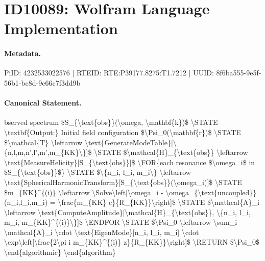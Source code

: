 \section*{ID10089: Wolfram Language Implementation}
\paragraph{Metadata.}
PiID: 4232533022576 | RTEID: RTE:P39177.8275:T1.7212 | UUID: 8f6ba555-9e5f-56b1-bc8d-9c66c7f3dd9b

\paragraph{Canonical Statement.}
bserved spectrum \$S\_\{\textbackslash{}text\{obs\}\}(\textbackslash{}omega, \textbackslash{}mathbf\{k\})\$ \textbackslash{}STATE \textbackslash{}textbf\{Output:\} Initial field configuration \$\textbackslash{}Psi\_0(\textbackslash{}mathbf\{r\})\$ \textbackslash{}STATE \$\textbackslash{}mathcal\{T\} \textbackslash{}leftarrow \textbackslash{}text\{GenerateModeTable\}[\textbackslash{}\{n,l,m,n',l',m',m\_\{KK\}\textbackslash{}\}]\$ \textbackslash{}STATE \$\textbackslash{}mathcal\{H\}\_\{\textbackslash{}text\{obs\}\} \textbackslash{}leftarrow \textbackslash{}text\{MeasureHelicity\}[S\_\{\textbackslash{}text\{obs\}\}]\$ \textbackslash{}FOR\{each resonance \$\textbackslash{}omega\_i\$ in \$S\_\{\textbackslash{}text\{obs\}\}\$\} \textbackslash{}STATE \$\textbackslash{}\{n\_i, l\_i, m\_i\textbackslash{}\} \textbackslash{}leftarrow \textbackslash{}text\{SphericalHarmonicTransform\}[S\_\{\textbackslash{}text\{obs\}\}(\textbackslash{}omega\_i)]\$ \textbackslash{}STATE \$m\_\{KK\}\textasciicircum{}\{(i)\} \textbackslash{}leftarrow \textbackslash{}Solve\textbackslash{}left[\textbackslash{}omega\_i - \textbackslash{}omega\_\{\textbackslash{}text\{uncoupled\}\}(n\_i,l\_i,m\_i) = \textbackslash{}frac\{m\_\{KK\} c\}\{R\_\{KK\}\}\textbackslash{}right]\$ \textbackslash{}STATE \$\textbackslash{}mathcal\{A\}\_i \textbackslash{}leftarrow \textbackslash{}text\{ComputeAmplitude\}[\textbackslash{}mathcal\{H\}\_\{\textbackslash{}text\{obs\}\}, \textbackslash{}\{n\_i, l\_i, m\_i, m\_\{KK\}\textasciicircum{}\{(i)\}\textbackslash{}\}]\$ \textbackslash{}ENDFOR \textbackslash{}STATE \$\textbackslash{}Psi\_0 \textbackslash{}leftarrow \textbackslash{}sum\_i \textbackslash{}mathcal\{A\}\_i \textbackslash{}cdot \textbackslash{}text\{EigenMode\}[n\_i, l\_i, m\_i] \textbackslash{}cdot \textbackslash{}exp\textbackslash{}left[\textbackslash{}frac\{2\textbackslash{}pi i m\_\{KK\}\textasciicircum{}\{(i)\} z\}\{R\_\{KK\}\}\textbackslash{}right]\$ \textbackslash{}RETURN \$\textbackslash{}Psi\_0\$ \textbackslash{}end\{algorithmic\} \textbackslash{}end\{algorithm\}

